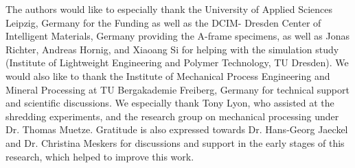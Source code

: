The authors would like to especially thank the University of Applied Sciences Leipzig, Germany
for the Funding as well as the DCIM- Dresden Center of Intelligent Materials, Germany
providing the A-frame specimens, as well as Jonas Richter, Andreas 
Hornig, and Xiaoang Si for helping with the simulation study (Institute 
of Lightweight Engineering and Polymer Technology, TU Dresden). We 
would also like to thank the Institute of Mechanical Process Engineering 
and  Mineral Processing  at  TU  Bergakademie  Freiberg,  Germany  for 
technical support and scientific discussions. We especially thank Tony 
Lyon, who assisted at the shredding experiments, and the research group 
on mechanical processing under Dr. Thomas Muetze. Gratitude is also 
expressed towards Dr. Hans-Georg Jaeckel and Dr. Christina Meskers for 
discussions and support in the early stages of this research, which helped 
to improve this work. 